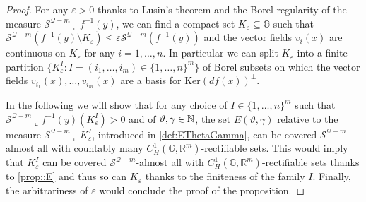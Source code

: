 \documentclass[10pt, a4paper,
oneside, headinclude,footinclude]{scrartcl}
\begin{document}
\begin{proof}
For any $\varepsilon>0$ thanks to Lusin's theorem and the Borel regularity of the measure $\mathcal{S}^{\mathcal{Q}-m}\llcorner f^{-1}(y)$, we can find a compact set $K_{\varepsilon}\subseteq\mathbb{G}$ such that $\mathcal{S}^{\mathcal{Q}-m}( f^{-1}(y)\setminus K_{\varepsilon})\leq \varepsilon \mathcal{S}^{\mathcal{Q}-m} (f^{-1}(y))$ and the vector fields $v_i(x)$ are continuous on $K_\varepsilon$ for any $i=1,\ldots,n$. In particular we can split $K_\varepsilon$ into a finite partition $\{K_{\varepsilon}^I:I=(i_1,\ldots,i_m)\in\{1,\ldots,n\}^m\}$ of Borel subsets on which the vector fields
$v_{i_1}(x),\ldots,v_{i_m}(x)$ are a basis for $\mathrm{Ker}(df(x))^\perp$.

In the following we will show that for any choice 
of $I \in\{1,\ldots,n\}^m$ such that $\mathcal{S}^{\mathcal{Q}-m}\llcorner f^{-1}(y)(K_{\varepsilon}^I)>0$ and of  $\vartheta,\gamma\in \mathbb{N}$, the set $E(\vartheta,\gamma)$ relative to the measure $\mathcal{S}^{\mathcal{Q}-m}\llcorner K_\varepsilon^I$, introduced in \cref{def:EThetaGamma}, can be covered $\mathcal{S}^{\mathcal{Q}-m}$-almost all with countably many $C^1_H(\mathbb G,\mathbb R^m)$-rectifiable sets. This would imply that $K_\varepsilon^I$ can be covered $\mathcal{S}^{\mathcal{Q}-m}$-almost all with $C^1_H(\mathbb G,\mathbb R^m)$-rectifiable sets thanks to \cref{prop::E} and thus so can $K_\varepsilon$ thanks to the finiteness of the family $I$. Finally, the arbitrariness of $\varepsilon$ would conclude the proof of the proposition. 


\end{proof}
\end{document}
